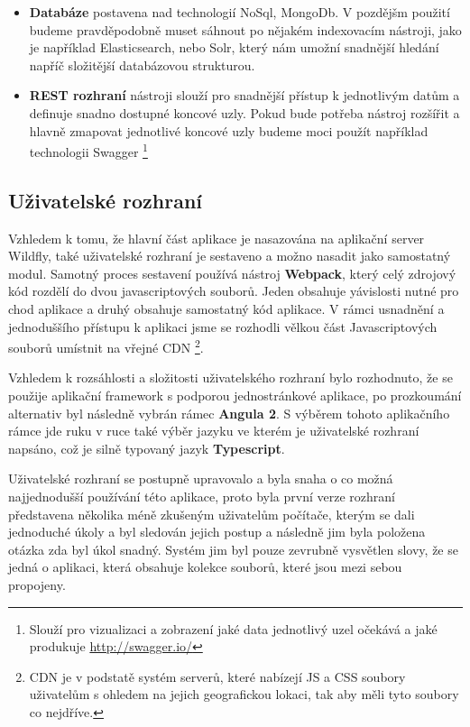 \begin{itemize}
  \item \textbf{Databáze} postavena nad technologií NoSql, MongoDb. V pozdějšm použití budeme pravděpodobně muset sáhnout po nějakém indexovacím nástroji, jako je například Elasticsearch, nebo Solr, který nám umožní snadnější hledání napříč složitější databázovou strukturou.
  \item \textbf{REST rozhraní} nástroji slouží pro snadnější přístup k jednotlivým datům a definuje snadno dostupné koncové uzly. Pokud bude potřeba nástroj rozšířit a hlavně zmapovat jednotlivé koncové uzly budeme moci použít například technologii Swagger \footnote{Slouží pro vizualizaci a zobrazení jaké data jednotlivý uzel očekává a jaké produkuje \url{http://swagger.io/}}
\end{itemize}

\subsection{Uživatelské rozhraní}
\par Vzhledem k tomu, že hlavní část aplikace je nasazována na aplikační server Wildfly, také uživatelské rozhraní je sestaveno a možno nasadit jako samostatný modul. Samotný proces sestavení používá nástroj \textbf{Webpack}, který celý zdrojový kód rozdělí do dvou javascriptových souborů. Jeden obsahuje yávislosti nutné pro chod aplikace a druhý obsahuje samostatný kód aplikace. V rámci usnadnění a jednoduššího přístupu k aplikaci jsme se rozhodli vělkou část Javascriptových souborů umístnit na vřejné CDN \footnote{CDN je v podstatě systém serverů, které nabízejí JS a CSS soubory uživatelům s ohledem na jejich geografickou lokaci, tak aby měli tyto soubory co nejdříve.}.

\par Vzhledem k rozsáhlosti a složitosti uživatelského rozhraní bylo rozhodnuto, že se použije aplikační framework s podporou jednostránkové aplikace, po prozkoumání alternativ byl následně vybrán rámec \textbf{Angula 2}. S výběrem tohoto aplikačního rámce jde ruku v ruce také výběr jazyku ve kterém je uživatelské rozhraní napsáno, což je silně typovaný jazyk \textbf{Typescript}.

\par Uživatelské rozhraní se postupně upravovalo a byla snaha o co možná najjednodušší používání této aplikace, proto byla první verze rozhraní představena několika méně zkušeným uživatelům počítače, kterým se dali jednoduché úkoly a byl sledován jejich postup a následně jim byla položena otázka zda byl úkol snadný. Systém jim byl pouze zevrubně vysvětlen slovy, že se jedná o aplikaci, která obsahuje kolekce souborů, které jsou mezi sebou propojeny.

